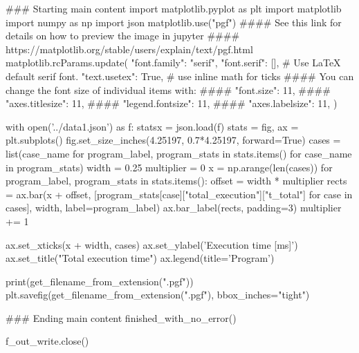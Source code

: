 ### Starting main content
import matplotlib.pyplot as plt
import matplotlib
import numpy as np
import json
matplotlib.use("pgf")
#### See this link for details on how to preview the image in jupyter
#### https://matplotlib.org/stable/users/explain/text/pgf.html
matplotlib.rcParams.update({
  "font.family": "serif",
  "font.serif": [], # Use LaTeX default serif font.
  "text.usetex": True, # use inline math for ticks
  #### You can change the font size of individual items with:
  #### "font.size": 11,
  #### "axes.titlesize": 11,
  #### "legend.fontsize": 11,
  #### "axes.labelsize": 11,
})

with open('../data1.json') as f:
    statsx = json.load(f)
stats = {}
fig, ax = plt.subplots()
fig.set_size_inches(4.25197, 0.7*4.25197, forward=True)
cases = list({case_name for program_label, program_stats in stats.items() for case_name in program_stats})
width = 0.25
multiplier = 0
x = np.arange(len(cases))
for program_label, program_stats in stats.items():
    offset = width * multiplier
    rects = ax.bar(x + offset, [program_stats[case]["total_execution"]["t_total"] for case in cases], width, label=program_label)
    ax.bar_label(rects, padding=3)
    multiplier += 1

ax.set_xticks(x + width, cases)
ax.set_ylabel('Execution time [ms]')
ax.set_title("Total execution time")
ax.legend(title='Program')

print(get_filename_from_extension(".pgf"))
plt.savefig(get_filename_from_extension(".pgf"), bbox_inches="tight")




### Ending main content
finished_with_no_error()


f_out_write.close()




